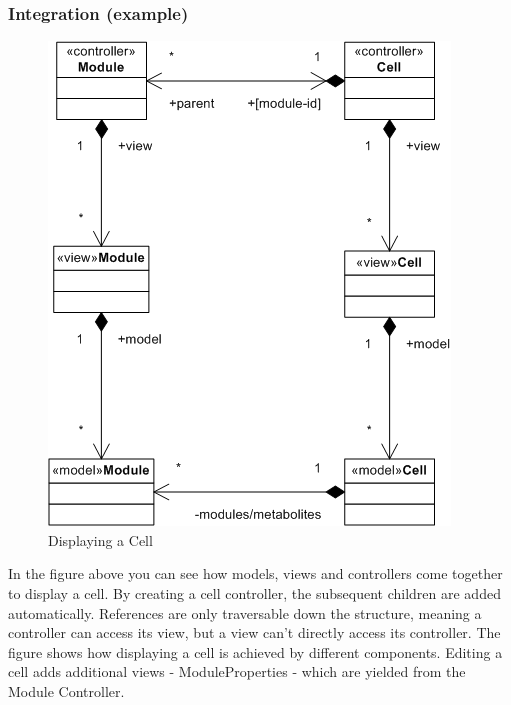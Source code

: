 \documentclass{report}
\begin{document}
				\subsubsection{Integration (example)}
					\begin{figure}[h!]
						\begin{center}
							\includegraphics[scale=1.4]{cell_struct.png}
							\caption{Displaying a Cell}
							\label{fig: cellstruct}
						\end{center}
					\end{figure}	
					\clearpage
					In the figure above you can see how models, views and controllers come together to display a cell. By creating a cell controller, the subsequent children are added automatically. References are only traversable down the structure, meaning a controller can access its view, but a view can't directly access its controller. The figure shows how displaying a cell is achieved by different components. Editing a cell adds additional views - ModuleProperties - which are yielded from the Module Controller. \\
					
\end{document}
